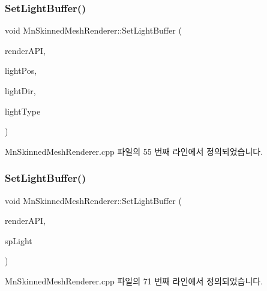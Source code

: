 \subsubsection{\texorpdfstring{Set\+Light\+Buffer()}{SetLightBuffer()}\hspace{0.1cm}{\footnotesize\ttfamily [1/2]}}
{\footnotesize\ttfamily void Mn\+Skinned\+Mesh\+Renderer\+::\+Set\+Light\+Buffer (\begin{DoxyParamCaption}\item[{\hyperlink{class_m_n_l_1_1_mn_render_a_p_i}{Mn\+Render\+A\+PI} \&}]{render\+A\+PI,  }\item[{const Direct\+X\+::\+Simple\+Math\+::\+Vector3 \&}]{light\+Pos,  }\item[{const Direct\+X\+::\+Simple\+Math\+::\+Vector3 \&}]{light\+Dir,  }\item[{\hyperlink{namespace_m_n_l_aac0b78de8bb8c872cb617ede813c113d}{M\+N\+\_\+\+L\+I\+G\+H\+T\+\_\+\+T\+Y\+PE}}]{light\+Type }\end{DoxyParamCaption})}



Mn\+Skinned\+Mesh\+Renderer.\+cpp 파일의 55 번째 라인에서 정의되었습니다.

\mbox{\label{class_m_n_l_1_1_mn_skinned_mesh_renderer_a7ff99b167cb891b1cf9b8dd68b45851f}} 
\subsubsection{\texorpdfstring{Set\+Light\+Buffer()}{SetLightBuffer()}\hspace{0.1cm}{\footnotesize\ttfamily [2/2]}}
{\footnotesize\ttfamily void Mn\+Skinned\+Mesh\+Renderer\+::\+Set\+Light\+Buffer (\begin{DoxyParamCaption}\item[{\hyperlink{class_m_n_l_1_1_mn_render_a_p_i}{Mn\+Render\+A\+PI} \&}]{render\+A\+PI,  }\item[{const std\+::shared\+\_\+ptr$<$ \hyperlink{class_m_n_l_1_1_mn_light_source}{Mn\+Light\+Source} $>$}]{sp\+Light }\end{DoxyParamCaption})}



Mn\+Skinned\+Mesh\+Renderer.\+cpp 파일의 71 번째 라인에서 정의되었습니다.


